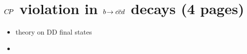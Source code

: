 
\section{\texorpdfstring{${C\!P}$}{CP} violation in \texorpdfstring{${b}\!\rightarrow {\ensuremath{c}}{\ensuremath{\overline {{c}}}}{\ensuremath{d}}$}{bToccbard} decays (4 pages)}
\label{sec:cpviolation:btoccbard}

\begin{itemize}
	\item theory on DD final states
	\item 
\end{itemize}

